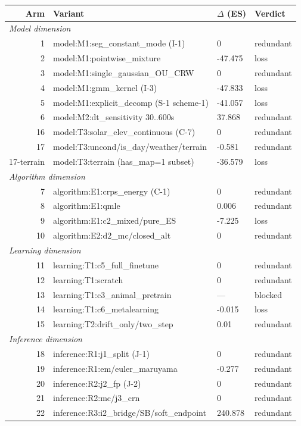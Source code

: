 \begin{tabular}{rlll}
\toprule
Arm & Variant & $\Delta$ (ES) & Verdict \\
\midrule
\multicolumn{4}{l}{\emph{Model dimension}} \\
1 & model:M1:seg\_constant\_mode (I-1) & 0 & redundant \\
2 & model:M1:pointwise\_mixture & -47.475 & loss \\
3 & model:M1:single\_gaussian\_OU\_CRW & 0 & redundant \\
4 & model:M1:gmm\_kernel (I-3) & -47.833 & loss \\
5 & model:M1:explicit\_decomp (S-1 scheme-1) & -41.057 & loss \\
6 & model:M2:dt\_sensitivity {30..600}s & 37.868 & redundant \\
16 & model:T3:solar\_elev\_continuous (C-7) & 0 & redundant \\
17 & model:T3:uncond/is\_day/weather/terrain & -0.581 & redundant \\
17-terrain & model:T3:terrain (has\_map=1 subset) & -36.579 & loss \\
\multicolumn{4}{l}{\emph{Algorithm dimension}} \\
7 & algorithm:E1:crps\_energy (C-1) & 0 & redundant \\
8 & algorithm:E1:qmle & 0.006 & redundant \\
9 & algorithm:E1:c2\_mixed/pure\_ES & -7.225 & loss \\
10 & algorithm:E2:d2\_mc/closed\_alt & 0 & redundant \\
\multicolumn{4}{l}{\emph{Learning dimension}} \\
11 & learning:T1:c5\_full\_finetune & 0 & redundant \\
12 & learning:T1:scratch & 0 & redundant \\
13 & learning:T1:c3\_animal\_pretrain & --- & blocked \\
14 & learning:T1:c6\_metalearning & -0.015 & loss \\
15 & learning:T2:drift\_only/two\_step & 0.01 & redundant \\
\multicolumn{4}{l}{\emph{Inference dimension}} \\
18 & inference:R1:j1\_split (J-1) & 0 & redundant \\
19 & inference:R1:em/euler\_maruyama & -0.277 & redundant \\
20 & inference:R2:j2\_fp (J-2) & 0 & redundant \\
21 & inference:R2:mc/j3\_crn & 0 & redundant \\
22 & inference:R3:i2\_bridge/SB/soft\_endpoint & 240.878 & redundant \\
\bottomrule
\end{tabular}
